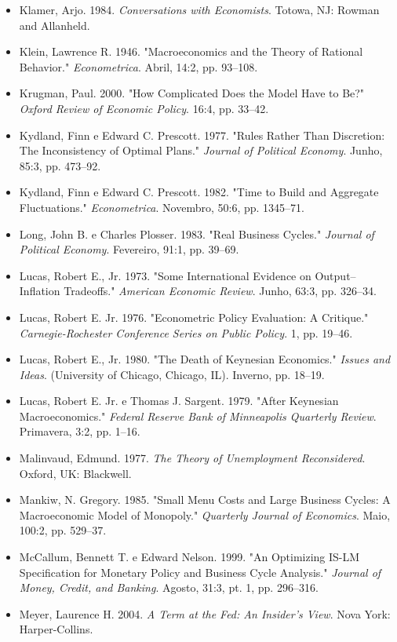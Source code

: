 \documentclass[12pt]{article}
\begin{document}
\begin{itemize}
    \item Klamer, Arjo. 1984. \textit{Conversations with Economists}. Totowa, NJ: Rowman and Allanheld.
    \item Klein, Lawrence R. 1946. "Macroeconomics and the Theory of Rational Behavior." \textit{Econometrica}. Abril, 14:2, pp. 93–108.
    \item Krugman, Paul. 2000. "How Complicated Does the Model Have to Be?" \textit{Oxford Review of Economic Policy}. 16:4, pp. 33–42.
    \item Kydland, Finn e Edward C. Prescott. 1977. "Rules Rather Than Discretion: The Inconsistency of Optimal Plans." \textit{Journal of Political Economy}. Junho, 85:3, pp. 473–92.
    \item Kydland, Finn e Edward C. Prescott. 1982. "Time to Build and Aggregate Fluctuations." \textit{Econometrica}. Novembro, 50:6, pp. 1345–71.
    \item Long, John B. e Charles Plosser. 1983. "Real Business Cycles." \textit{Journal of Political Economy}. Fevereiro, 91:1, pp. 39–69.
    \item Lucas, Robert E., Jr. 1973. "Some International Evidence on Output–Inflation Tradeoffs." \textit{American Economic Review}. Junho, 63:3, pp. 326–34.
    \item Lucas, Robert E. Jr. 1976. "Econometric Policy Evaluation: A Critique." \textit{Carnegie-Rochester Conference Series on Public Policy}. 1, pp. 19–46.
    \item Lucas, Robert E., Jr. 1980. "The Death of Keynesian Economics." \textit{Issues and Ideas}. (University of Chicago, Chicago, IL). Inverno, pp. 18–19.
    \item Lucas, Robert E. Jr. e Thomas J. Sargent. 1979. "After Keynesian Macroeconomics." \textit{Federal Reserve Bank of Minneapolis Quarterly Review}. Primavera, 3:2, pp. 1–16.
    \item Malinvaud, Edmund. 1977. \textit{The Theory of Unemployment Reconsidered}. Oxford, UK: Blackwell.
    \item Mankiw, N. Gregory. 1985. "Small Menu Costs and Large Business Cycles: A Macroeconomic Model of Monopoly." \textit{Quarterly Journal of Economics}. Maio, 100:2, pp. 529–37.
    \item McCallum, Bennett T. e Edward Nelson. 1999. "An Optimizing IS-LM Specification for Monetary Policy and Business Cycle Analysis." \textit{Journal of Money, Credit, and Banking}. Agosto, 31:3, pt. 1, pp. 296–316.
    \item Meyer, Laurence H. 2004. \textit{A Term at the Fed: An Insider’s View}. Nova York: Harper-Collins.

\end{itemize}
\end{document}
